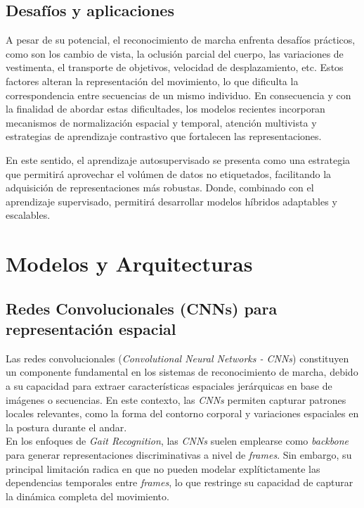 \subsection{Desafíos y aplicaciones}

A pesar de su potencial, el reconocimiento de marcha enfrenta desafíos prácticos, como son los cambio de vista, la oclusión parcial del cuerpo, las variaciones de vestimenta, el transporte de objetivos, velocidad de desplazamiento, etc. Estos factores alteran la representación del movimiento, lo que dificulta la correspondencia entre secuencias de un mismo individuo. En consecuencia y con la finalidad de abordar estas dificultades, los modelos recientes incorporan mecanismos de normalización espacial y temporal, atención multivista y estrategias de aprendizaje contrastivo que fortalecen las representaciones.

En este sentido, el aprendizaje autosupervisado se presenta como una estrategia que permitirá aprovechar el volúmen de datos no etiquetados, facilitando la adquisición de representaciones más robustas. Donde, combinado con el aprendizaje supervisado, permitirá desarrollar modelos híbridos adaptables y escalables. 

\section{Modelos y Arquitecturas}

\subsection{Redes Convolucionales (CNNs) para representación espacial}

Las redes convolucionales (\textit{Convolutional Neural Networks - CNNs}) constituyen un componente fundamental en los sistemas de reconocimiento de marcha, debido a su capacidad para extraer características espaciales jerárquicas en base de imágenes o secuencias. En este contexto, las \textit{CNNs} permiten capturar patrones locales relevantes, como la forma del contorno corporal y variaciones espaciales en la postura durante el andar. \\
En los enfoques de \textit{Gait Recognition}, las \textit{CNNs} suelen emplearse como \textit{backbone} para generar representaciones discriminativas a nivel de \textit{frames}. Sin embargo, su principal limitación radica en que no pueden modelar explítictamente las dependencias temporales entre \textit{frames}, lo que restringe su capacidad de capturar la dinámica completa del movimiento.

